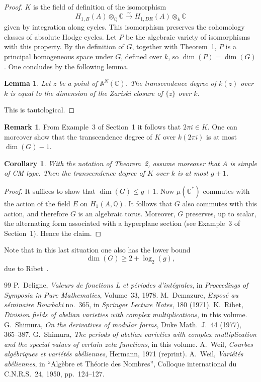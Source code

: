 \documentclass[11pt]{amsart}
\newtheorem{lemma}{Lemma}
\newtheorem{corollary}{Corollary}
\theoremstyle{definition}
\newtheorem{remark}{Remark}
\newcommand{\QQ}{\mathbb{Q}}
\newcommand{\CC}{\mathbb{C}}
\begin{document}
\begin{proof}
$K$ is the field of definition of the isomorphism
\[
H_{1,B}(A)\otimes_\QQ \CC \xrightarrow{\sim} H_{1,DR}(A)\otimes_k \CC
\]
given by integration along cycles. This isomorphism preserves the cohomology classes of absolute Hodge cycles. Let $P$ be the algebraic variety of isomorphisms with this property. By the definition of $G$, together with Theorem~1, $P$ is a principal homogeneous space under $G$, defined over $k$, so $\dim(P)=\dim(G)$. One concludes by the following lemma.

\begin{lemma}
Let $z$ be a point of $\mathbb A^N(\CC)$. The transcendence degree of $k(z)$ over $k$ is equal to the dimension of the Zariski closure of $\{z\}$ over $k$.
\end{lemma}

This is tautological.
\end{proof}

\begin{remark}
From Example~3 of Section~1 it follows that $2\pi i\in K$. One can moreover show that the transcendence degree of $K$ over $k(2\pi i)$ is at most $\dim(G)-1$.
\end{remark}

\begin{corollary}
With the notation of Theorem~2, assume moreover that $A$ is simple of CM type. Then the transcendence degree of $K$ over $k$ is at most $g+1$.
\end{corollary}

\begin{proof}
It suffices to show that $\dim(G)\le g+1$. Now $\mu(\CC^*)$ commutes with the action of the field $E$ on $H_1(A,\QQ)$. It follows that $G$ also commutes with this action, and therefore $G$ is an algebraic torus. Moreover, $G$ preserves, up to scalar, the alternating form associated with a hyperplane section (see Example~3 of Section~1). Hence the claim.
\end{proof}

Note that in this last situation one also has the lower bound
\[
\dim(G)\ge 2+\log_2(g),
\]
due to Ribet~\cite{Ribet}.

\begin{thebibliography}{99}
 P.~Deligne, \textit{Valeurs de fonctions L et p\'eriodes d'int\'egrales}, in \textit{Proceedings of Symposia in Pure Mathematics}, Volume~33, 1978.
 M.~Demazure, \textit{Expos\'e au s\'eminaire Bourbaki} no.~365, in \textit{Springer Lecture Notes}, 180 (1971).
 K.~Ribet, \textit{Division fields of abelian varieties with complex multiplications}, in this volume.
 G.~Shimura, \textit{On the derivatives of modular forms}, Duke Math.~J.~44 (1977), 365--387.
 G.~Shimura, \textit{The periods of abelian varieties with complex multiplication and the special values of certain zeta functions}, in this volume.
 A.~Weil, \textit{Courbes alg\'ebriques et vari\'et\'es ab\'eliennes}, Hermann, 1971 (reprint).
 A.~Weil, \textit{Vari\'et\'es ab\'eliennes}, in ``Alg\`ebre et Th\'eorie des Nombres'', Colloque international du C.N.R.S.~24, 1950, pp.~124--127.
\end{thebibliography}
\end{document}
